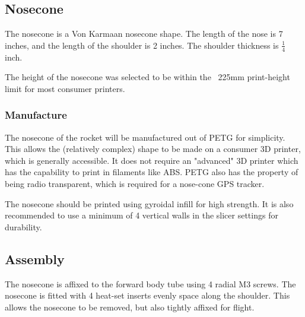 \subsection{Nosecone}

The nosecone is a Von Karmaan nosecone shape. The length of the nose is 7
inches, and the length of the shoulder is 2 inches. The shoulder thickness is
$\frac{1}{4}$ inch.

The height of the nosecone was selected to be within the ~225mm print-height
limit for most consumer printers.

\subsubsection{Manufacture}

The nosecone of the rocket will be manufactured out of PETG for simplicity. This
allows the (relatively complex) shape to be made on a consumer 3D printer, which
is generally accessible. It does not require an "advanced" 3D printer which has
the capability to print in filaments like ABS. PETG also has the property of
being radio transparent, which is required for a nose-cone GPS tracker.

The nosecone should be printed using gyroidal infill for high strength. It is
also recommended to use a minimum of 4 vertical walls in the slicer settings for
durability.

\subsection{Assembly}

The nosecone is affixed to the forward body tube using 4 radial M3 screws. The
nosecone is fitted with 4 heat-set inserts evenly space along the shoulder. This
allows the nosecone to be removed, but also tightly affixed for flight.

